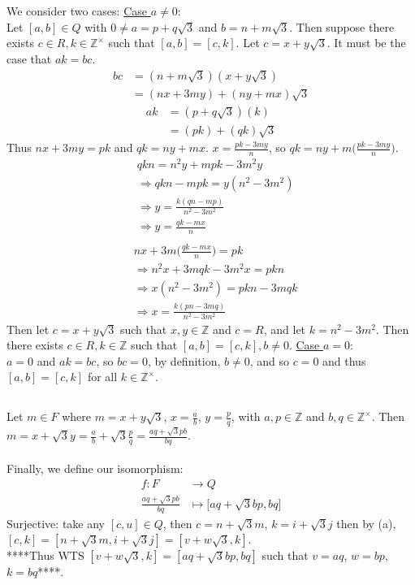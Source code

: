 \documentclass{article}
\begin{document}
\renewcommand{\thesubsection}{\thesection.\alph{subsection}}
\section{} %
\subsection{} %
We consider two cases:
\underline{Case $a\neq0$}:\\
Let $[a,b]\in Q$ with $0\neq a=p+q\sqrt{3}$ and $b=n+m\sqrt{3}$. Then suppose
there exists $c\in R,k\in\mathbb{Z}^\times$ such that $[a,b]=[c,k]$. Let
$c=x+y\sqrt{3}$. It must be the case that $ak=bc$.
\begin{align*}
	bc&=(n+m\sqrt{3})(x+y\sqrt{3})\\
	&=(nx+3my)+(ny+mx)\sqrt{3}
\end{align*}
\begin{align*}
	ak&=(p+q\sqrt{3})(k)\\
	&=(pk)+(qk)\sqrt{3}
\end{align*}
Thus $nx+3my=pk$ and $qk=ny+mx$. $x=\frac{pk-3my}{n}$, so
$qk=ny+m\bigg(\frac{pk-3my}{n}\bigg)$.
\begin{align*}
	&qkn=n^2y+mpk-3m^2y\\
	&\Longrightarrow qkn-mpk=y(n^2-3m^2)\\
	&\Longrightarrow y=\frac{k(qn-mp)}{n^2-3m^2}\\
	&\Longrightarrow y=\frac{qk-mx}{n}\\
\end{align*}
\begin{align*}
	&nx+3m\bigg(\frac{qk-mx}{n}\bigg)=pk\\
	&\Longrightarrow n^2x+3mqk-3m^2x=pkn\\
	&\Longrightarrow x(n^2-3m^2)=pkn-3mqk\\
	&\Longrightarrow x=\frac{k(pn-3mq)}{n^2-3m^2}
\end{align*}
Then let $c=x+y\sqrt{3}$ such that $x,y\in\mathbb{Z}$ and $c=R$, and let
$k=n^2-3m^2$. Then there exists $c\in R,k\in\mathbb{Z}$ such that
$[a,b]=[c,k],b\neq0$.
\underline{Case $a=0$}:\\
$a=0$ and $ak=bc$, so $bc=0$, by definition, $b\neq0$, and so $c=0$ and thus
$[a,b]=[c,k]$ for all $k\in\mathbb{Z}^\times$.
\subsection{} %
Let $m\in F$ where $m=x+y\sqrt{3}$,
$x=\frac{a}{b}$, $y=\frac{p}{q}$, with $a,p\in\mathbb{Z}$ and
$b,q\in\mathbb{Z}^\times$. Then $m=x+\sqrt{3}y=\frac{a}{b}+\sqrt{3}\frac{p}{q}=
\frac{aq+\sqrt{3}pb}{bq}$.\\\\
Finally, we define our isomorphism:
\begin{align*}
	f:F&\longrightarrow Q\\
	\frac{aq+\sqrt{3}pb}{bq}&\longmapsto{[aq+\sqrt{3}bp},bq]
\end{align*}
Surjective: take any $[c,u]\in Q$, then $c=n+\sqrt{3}m$, $k=i+\sqrt{3}j$
then by (a), $[c,k]=[n+\sqrt{3}m,i+\sqrt{3}j]=[v+w\sqrt{3},k]$.\\
****Thus WTS $[v+w\sqrt{3},k]=[aq+\sqrt{3}bp,bq]$ such that $v=aq$,
$w=bp$, $k=bq$****.
\end{document}
